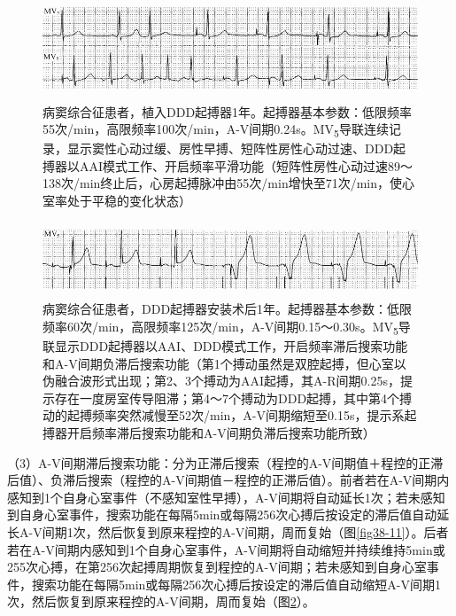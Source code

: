 \begin{figure}[!htbp]
 \centering
 \includegraphics[width=5.58333in,height=1.20833in]{./images/Image00633.jpg}
 \captionsetup{justification=centering}
 \caption{病窦综合征患者，植入DDD起搏器1年。起搏器基本参数：低限频率55次/min，高限频率100次/min，A-V间期0.24s。MV\textsubscript{5}导联连续记录，显示窦性心动过缓、房性早搏、短阵性房性心动过速、DDD起搏器以AAI模式工作、开启频率平滑功能（短阵性房性心动过速89～138次/min终止后，心房起搏脉冲由55次/min增快至71次/min，使心室率处于平稳的变化状态）}
 \label{fig38-30}
  \end{figure} 


\begin{figure}[!htbp]
 \centering
 \includegraphics[width=5.58333in,height=0.875in]{./images/Image00634.jpg}
 \captionsetup{justification=centering}
 \caption{病窦综合征患者，DDD起搏器安装术后1年。起搏器基本参数：低限频率60次/min，高限频率125次/min，A-V间期0.15～0.30s。MV\textsubscript{5}导联显示DDD起搏器以AAI、DDD模式工作，开启频率滞后搜索功能和A-V间期负滞后搜索功能（第1个搏动虽然是双腔起搏，但心室以伪融合波形式出现；第2、3个搏动为AAI起搏，其A-R间期0.25s，提示存在一度房室传导阻滞；第4～7个搏动为DDD起搏，其中第4个搏动的起搏频率突然减慢至52次/min，A-V间期缩短至0.15s，提示系起搏器开启频率滞后搜索功能和A-V间期负滞后搜索功能所致）}
 \label{fig38-31}
  \end{figure} 


（3）A-V间期滞后搜索功能：分为正滞后搜索（程控的A-V间期值＋程控的正滞后值）、负滞后搜索（程控的A-V间期值－程控的正滞后值）。前者若在A-V间期内感知到1个自身心室事件（不感知室性早搏），A-V间期将自动延长1次；若未感知到自身心室事件，搜索功能在每隔5min或每隔256次心搏后按设定的滞后值自动延长A-V间期1次，然后恢复到原来程控的A-V间期，周而复始（图\ref{fig38-11}）。后者若在A-V间期内感知到1个自身心室事件，A-V间期将自动缩短并持续维持5min或255次心搏，在第256次起搏周期恢复到程控的A-V间期；若未感知到自身心室事件，搜索功能在每隔5min或每隔256次心搏后按设定的滞后值自动缩短A-V间期1次，然后恢复到原来程控的A-V间期，周而复始（图\ref{fig38-31}）。

